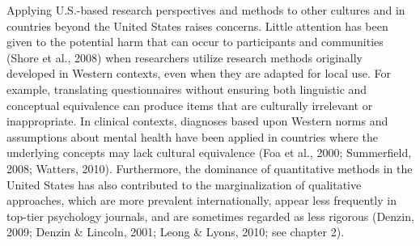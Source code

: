 \documentclass[
  11pt,
]{book}
\begin{document}
Applying U.S.-based research perspectives and methods to other cultures and in countries beyond the United States raises concerns. Little attention has been given to the potential harm that can occur to participants and communities (Shore et al., 2008) when researchers utilize research methods originally developed in Western contexts, even when they are adapted for local use. For example, translating questionnaires without ensuring both linguistic and conceptual equivalence can produce items that are culturally irrelevant or inappropriate. In clinical contexts, diagnoses based upon Western norms and assumptions about mental health have been applied in countries where the underlying concepts may lack cultural equivalence (Foa et al., 2000; Summerfield, 2008; Watters, 2010). Furthermore, the dominance of quantitative methods in the United States has also contributed to the marginalization of qualitative approaches, which are more prevalent internationally, appear less frequently in top-tier psychology journals, and are sometimes regarded as less rigorous (Denzin, 2009; Denzin \& Lincoln, 2001; Leong \& Lyons, 2010; see chapter 2).
\end{document}
